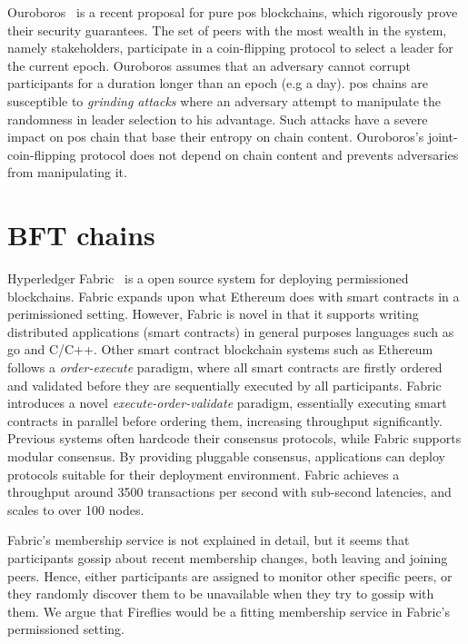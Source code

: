 \documentclass[USenglish]{uit-thesis}
\begin{document}
Ouroboros~\cite{provepos} is a recent proposal for pure \gls{pos} blockchains, which rigorously prove their security guarantees.
The set of peers with the most wealth in the system, namely stakeholders, participate in a coin-flipping protocol to select a leader for the current epoch.
Ouroboros assumes that an adversary cannot corrupt participants for a duration longer than an epoch (e.g a day).
\gls{pos} chains are susceptible to \textit{grinding attacks} where an adversary attempt to manipulate the randomness in leader selection to his advantage.
Such attacks have a severe impact on \gls{pos} chain that base their entropy on chain content.
Ouroboros's joint-coin-flipping protocol does not depend on chain content and prevents adversaries from manipulating it.


\section{BFT chains}
Hyperledger Fabric~\cite{hyper, hyper2, hyper3, hyper4} is a open source system for deploying permissioned blockchains.
Fabric expands upon what Ethereum does with smart contracts in a perimissioned setting.
However, Fabric is novel in that it supports writing distributed applications (smart contracts) in general purposes languages such as \gls{go} and C/C++.
Other smart contract blockchain systems such as Ethereum~\cite{ether} follows a \textit{order-execute} paradigm, where all smart contracts are firstly ordered and validated before they are sequentially executed by all participants.
Fabric introduces a novel \textit{execute-order-validate} paradigm, essentially executing smart contracts in parallel before ordering them, increasing throughput significantly.
Previous systems often hardcode their consensus protocols, while Fabric supports modular consensus.
By providing pluggable consensus, applications can deploy protocols suitable for their deployment environment.	
Fabric achieves a throughput around 3500 transactions per second with sub-second latencies, and scales to over 100 nodes.

Fabric's membership service is not explained in detail, but it seems that participants gossip about recent membership changes, both leaving and joining peers.
Hence, either participants are assigned to monitor other specific peers, or they randomly discover them to be unavailable when they try to gossip with them.
We argue that Fireflies would be a fitting membership service in Fabric's permissioned setting.
\end{document}
